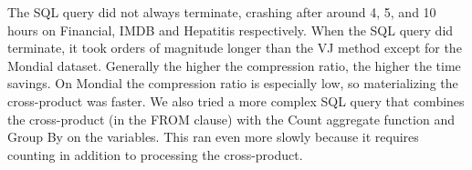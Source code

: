 \documentclass{acm_proc_article-sp}
\begin{document}
The SQL query did not always terminate, crashing after around 4, 5, and 10 hours on Financial, IMDB and Hepatitis respectively. When the SQL query did terminate, it took orders of magnitude longer than the VJ method except for the Mondial dataset. Generally the higher the compression ratio, the higher the time savings. On Mondial the compression ratio is especially low, so materializing the cross-product was faster. We also tried a more complex SQL query that combines the cross-product (in the FROM clause) with the Count aggregate function and Group By on the variables. This ran even more slowly because it requires counting in addition to processing the cross-product. 
\begin{table}[htbp]
  \centering
  \caption{Number of Sufficient Statistics for Link Analysis On and Off.}
  \label{table:link-onoff}%
\end{table}%
\end{document}
